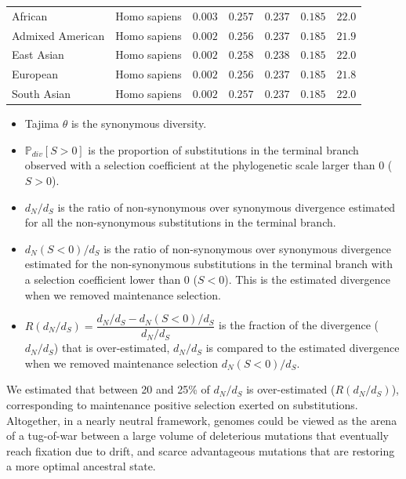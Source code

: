 \documentclass{article}
\newcommand{\dn}{d_N}
\newcommand{\ds}{d_S}
\newcommand{\dnds}{\dn / \ds}
\newcommand{\Sphy}{S}
\begin{document}
\begin{center}
\begin{longtable*}{|l|l|r|r|r|r|r|}
            African &        Homo sapiens &               $ 0.003$ &                $ 0.257$ &        $ 0.237$ &              $ 0.185$ &           $  22.0$ \\
            Admixed American &        Homo sapiens &               $ 0.002$ &                $ 0.256$ &        $ 0.237$ &              $ 0.185$ &           $  21.9$ \\
            East Asian &        Homo sapiens &               $ 0.002$ &                $ 0.258$ &        $ 0.238$ &              $ 0.185$ &           $  22.0$ \\
            European &        Homo sapiens &               $ 0.002$ &                $ 0.256$ &        $ 0.237$ &              $ 0.185$ &           $  21.8$ \\
            South Asian &        Homo sapiens &               $ 0.002$ &                $ 0.257$ &        $ 0.237$ &              $ 0.185$ &           $  22.0$ \\
        \end{longtable*}
    \end{center}
    \begin{itemize}
        \item Tajima $\theta$ is the synonymous diversity.
        \item $\mathbb{P}_{div}[\Sphy > 0]$ is the proportion of substitutions in the terminal branch observed with a selection coefficient at the phylogenetic scale larger than 0 ($\Sphy > 0$).
        \item $\dnds$ is the ratio of non-synonymous over synonymous divergence estimated for all the non-synonymous substitutions in the terminal branch.
        \item $\dn(\Sphy < 0) / \ds$ is the ratio of non-synonymous over synonymous divergence estimated for the non-synonymous substitutions in the terminal branch with a selection coefficient lower than 0 ($\Sphy < 0$).
        This is the estimated divergence when we removed maintenance selection.
        \item $R(\dnds)=\dfrac{\dnds - \dn(\Sphy < 0) / \ds}{\dnds}$ is the fraction of the divergence ($\dnds$) that is over-estimated, $\dnds$ is compared to the estimated divergence when we removed maintenance selection $\dn(\Sphy < 0) / \ds$.
    \end{itemize}

    We estimated that between 20 and 25\% of $\dnds$ is over-estimated ($R(\dnds)$), corresponding to maintenance positive selection exerted on substitutions.
    Altogether, in a nearly neutral framework, genomes could be viewed as the arena of a tug-of-war between a large volume of deleterious mutations that eventually reach fixation due to drift, and scarce advantageous mutations that are restoring a more optimal ancestral state.
\end{document}
